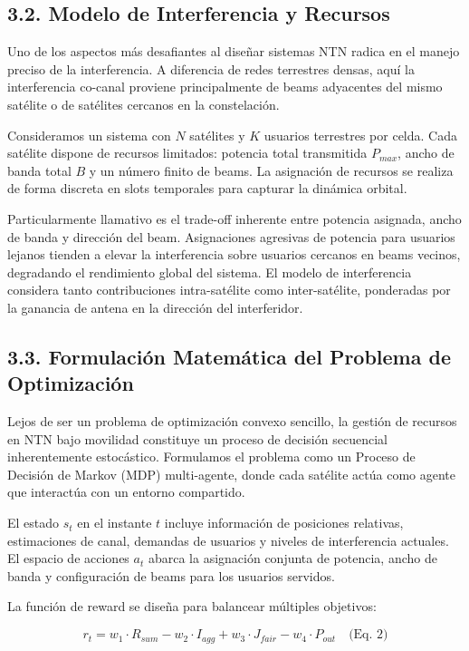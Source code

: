 \subsection{3.2. Modelo de Interferencia y Recursos}

Uno de los aspectos más desafiantes al diseñar sistemas NTN radica en el manejo preciso de la interferencia. A diferencia de redes terrestres densas, aquí la interferencia co-canal proviene principalmente de beams adyacentes del mismo satélite o de satélites cercanos en la constelación.

Consideramos un sistema con $N$ satélites y $K$ usuarios terrestres por celda. Cada satélite dispone de recursos limitados: potencia total transmitida $P_{max}$, ancho de banda total $B$ y un número finito de beams. La asignación de recursos se realiza de forma discreta en slots temporales para capturar la dinámica orbital.

Particularmente llamativo es el trade-off inherente entre potencia asignada, ancho de banda y dirección del beam. Asignaciones agresivas de potencia para usuarios lejanos tienden a elevar la interferencia sobre usuarios cercanos en beams vecinos, degradando el rendimiento global del sistema. El modelo de interferencia considera tanto contribuciones intra-satélite como inter-satélite, ponderadas por la ganancia de antena en la dirección del interferidor.

\subsection{3.3. Formulación Matemática del Problema de Optimización}

Lejos de ser un problema de optimización convexo sencillo, la gestión de recursos en NTN bajo movilidad constituye un proceso de decisión secuencial inherentemente estocástico. Formulamos el problema como un Proceso de Decisión de Markov (MDP) multi-agente, donde cada satélite actúa como agente que interactúa con un entorno compartido.

El estado $s_t$ en el instante $t$ incluye información de posiciones relativas, estimaciones de canal, demandas de usuarios y niveles de interferencia actuales. El espacio de acciones $a_t$ abarca la asignación conjunta de potencia, ancho de banda y configuración de beams para los usuarios servidos. 

La función de reward se diseña para balancear múltiples objetivos:

\begin{equation}
r_t = w_1 \cdot R_{sum} - w_2 \cdot I_{agg} + w_3 \cdot J_{fair} - w_4 \cdot P_{out}
\quad \text{(Eq. 2)}
\end{equation}


